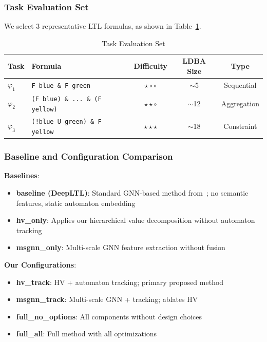 \documentclass[conference]{IEEEtran}
\begin{document}
\subsubsection{Task Evaluation Set}

We select 3 representative LTL formulas, as shown in Table~\ref{tab:tasks}.

\begin{table}[t]
\centering
\caption{Task Evaluation Set}
\label{tab:tasks}
\begin{tabular}{@{}llccc@{}}
\toprule
\textbf{Task} & \textbf{Formula} & \textbf{Difficulty} & \textbf{LDBA Size} & \textbf{Type} \\ \midrule
$\varphi_1$ & \texttt{F blue \& F green} & $\star\circ\circ$ & $\sim$5 & Sequential \\
$\varphi_2$ & \texttt{(F blue) \& ... \& (F yellow)} & $\star\star\circ$ & $\sim$12 & Aggregation \\
$\varphi_3$ & \texttt{(!blue U green) \& F yellow} & $\star\star\star$ & $\sim$18 & Constraint \\ \bottomrule
\end{tabular}
\end{table}

\subsubsection{Baseline and Configuration Comparison}

\textbf{Baselines}:
\begin{itemize}
    \item \textbf{baseline (DeepLTL)}: Standard GNN-based method from~\cite{jackermeier2025deepltl}; no semantic features, static automaton embedding
    \item \textbf{hv\_only}: Applies our hierarchical value decomposition without automaton tracking
    \item \textbf{msgnn\_only}: Multi-scale GNN feature extraction without fusion
\end{itemize}

\textbf{Our Configurations}:
\begin{itemize}
    \item \textbf{hv\_track}: HV + automaton tracking; primary proposed method
    \item \textbf{msgnn\_track}: Multi-scale GNN + tracking; ablates HV
    \item \textbf{full\_no\_options}: All components without design choices
    \item \textbf{full\_all}: Full method with all optimizations
\end{itemize}
\end{document}
